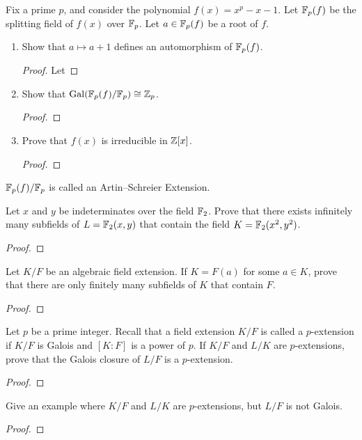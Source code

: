 \begin{problem}
  Fix a prime $p$, and consider the polynomial
  $f(x)=x^p-x-1$. Let $\mathbb{F}_p(f)$ be the splitting field of
  $f(x)$ over $\mathbb{F}_p$. Let $a\in\mathbb{F}_p(f)$ be a root
  of $f$.
  \begin{enumerate}[label=(\alph*)]
  \item Show that $a\mapsto a+1$ defines an automorphism of
    $\mathbb{F}_p(f)$.
    \begin{proof}
      Let
    \end{proof}
  \item Show that
    $\operatorname{Gal}(\mathbb{F}_p(f)/\mathbb{F}_p)\cong\mathbb{Z}_p$.
    \begin{proof}
    \end{proof}
  \item Prove that $f(x)$ is irreducible in $\mathbb{Z}[x]$.
    \begin{proof}
    \end{proof}
  \end{enumerate}
  $\mathbb{F}_p(f)/\mathbb{F}_p$ is called an Artin--Schreier
  Extension.
\end{problem}

\begin{problem}
  Let $x$ and $y$ be indeterminates over the field
  $\mathbb{F}_2$. Prove that there exists infinitely many
  subfields of $L=\mathbb{F}_2(x,y)$ that contain the field
  $K=\mathbb{F}_2(x^2,y^2)$.
\begin{proof}
\end{proof}
\end{problem}

\begin{problem}
  Let $K/F$ be an algebraic field extension. If
  $K=F(a)$ for some $a\in K$, prove that there are only finitely
  many subfields of $K$ that contain $F$.
\begin{proof}
\end{proof}
\end{problem}

\begin{problem}
  Let $p$ be a prime integer. Recall that a field extension $K/F$
  is called a $p$-extension if $K/F$ is Galois and $[K:F]$ is a
  power of $p$. If $K/F$ and $L/K$ are $p$-extensions, prove that
  the Galois closure of $L/F$ is a $p$-extension.
\begin{proof}
\end{proof}
\end{problem}

\begin{problem}
  Give an example where $K/F$ and $L/K$ are $p$-extensions, but
  $L/F$ is not Galois.
\begin{proof}
\end{proof}
\end{problem}

